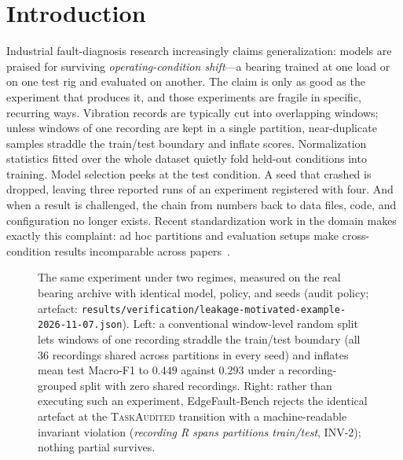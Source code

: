 \section{Introduction}
\label{sec:intro}

Industrial fault-diagnosis research increasingly claims generalization:
models are praised for surviving \emph{operating-condition shift}---a bearing
trained at one load or on one test rig and evaluated on another. The claim is
only as good as the experiment that produces it, and those experiments are
fragile in specific, recurring ways. Vibration records are typically cut into
overlapping windows; unless windows of one recording are kept in a single
partition, near-duplicate samples straddle the train/test boundary and inflate
scores. Normalization statistics fitted over the whole dataset quietly fold
held-out conditions into training. Model selection peeks at the test
condition. A seed that crashed is dropped, leaving three reported runs of an
experiment registered with four. And when a result is challenged, the chain
from numbers back to data files, code, and configuration no longer exists.
Recent standardization work in the domain makes exactly this complaint: ad hoc
partitions and evaluation setups make cross-condition results incomparable
across papers~\cite{zhao2024dgbenchmark,ieeeaccess2025standard}.

\begin{figure}[t]
\centering
\caption{The same experiment under two regimes, measured on the real bearing
archive with identical model, policy, and seeds (audit policy; artefact:
\texttt{results/verification/leakage-motivated-example-2026-11-07.json}).
Left: a conventional window-level random split lets windows of one recording
straddle the train/test boundary (all 36 recordings shared across partitions
in every seed) and inflates mean test Macro-F1 to $0.449$ against $0.293$
under a recording-grouped split with zero shared recordings. Right: rather
than executing such an experiment, EdgeFault-Bench rejects the identical
artefact at the \textsc{TaskAudited} transition with a machine-readable
invariant violation (\emph{recording R spans partitions train/test}, INV-2);
nothing partial survives.}
\label{fig:motivated}
\end{figure}

